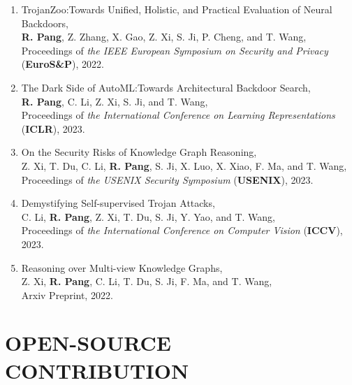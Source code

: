 \documentclass[letterpaper,11pt]{article}
\begin{document}
\begin{enumerate}[labelsep=15pt, parsep=-4pt]
    \item TrojanZoo:\@ Towards Unified, Holistic, and Practical Evaluation of Neural Backdoors,\\
    \textbf{R. Pang}, Z. Zhang, X. Gao, Z. Xi, S. Ji, P. Cheng, and T. Wang,\\
    Proceedings of {\it the IEEE European Symposium on Security and Privacy\/} (\textbf{EuroS\&P}), 2022.
    
    \item The Dark Side of AutoML:\@ Towards Architectural Backdoor Search,\\
    \textbf{R. Pang}, C. Li, Z. Xi, S. Ji, and T. Wang,\\
    Proceedings of {\it the International Conference on Learning Representations\/} (\textbf{ICLR}), 2023.
    
    \item On the Security Risks of Knowledge Graph Reasoning,\\
    Z. Xi, T. Du, C. Li, \textbf{R. Pang}, S. Ji, X. Luo, X. Xiao, F. Ma, and T. Wang,\\
    Proceedings of {\it the USENIX Security Symposium\/} (\textbf{USENIX}), 2023.
    
    \item Demystifying Self-supervised Trojan Attacks,\\
    C. Li, \textbf{R. Pang}, Z. Xi, T. Du, S. Ji, Y. Yao, and T. Wang,\\
    Proceedings of {\it the International Conference on Computer Vision\/} (\textbf{ICCV}), 2023.

    \item Reasoning over Multi-view Knowledge Graphs,\\
    Z. Xi, \textbf{R. Pang}, C. Li, T. Du, S. Ji, F. Ma, and T. Wang,\\
    Arxiv Preprint, 2022.

    \end{enumerate}


\section{OPEN-SOURCE CONTRIBUTION}
\end{document}
